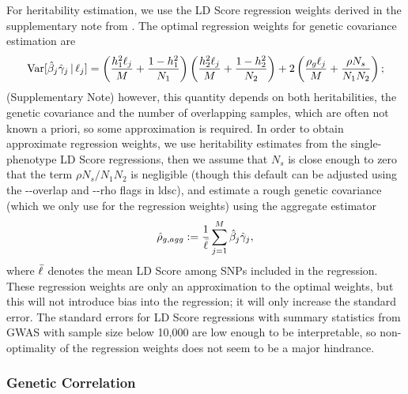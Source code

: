 \documentclass[11pt]{article}
\numberwithin{equation}{section}
\begin{document}
For heritability estimation, we use the LD Score regression weights derived in the 
supplementary note from \cite{buliksullivan2014}. 
The optimal regression weights for genetic covariance estimation are 
$$ \mathrm{Var}[\hat{\beta}_j\hat{\gamma}_j \,|\, \ell_j ] = 
	\left( 
		\frac{h_{1}^2\ell_j}{M} 
		+ 
		\frac{1-h_{1}^2}{N_1} 
	\right) \left(  
		\frac{h_{2}^2\ell_j}{M} 
		+ 
		\frac{1-h_{2}^2}{N_2}
	\right) 
	+ 					
	2\left( 
		\frac{\rho_g\ell_j}{M} 
		+ 
		\frac{\rho N_s}{N_1N_2} 
	\right);
$$
(Supplementary Note) however, this quantity depends on both heritabilities, 
the genetic covariance and the number of overlapping samples,
which are often not known a priori, so some approximation is required.
In order to obtain approximate regression weights, 
we use heritability estimates from the single-phenotype LD Score regressions, then
we assume that $N_s$ is close enough to zero that the term $\rho N_s/N_1N_2$ is negligible
(though this default can be adjusted using the {-}{-}overlap and {-}{-}rho flags in ldsc),
and estimate a rough genetic covariance (which we only use for the regression weights)
using the aggregate estimator 
$$\hat{\rho}_{g, agg} := \frac{1}{\bar{\ell}}\sum_{j=1}^M \hat{\beta}_j\hat{\gamma}_j,$$
where $\bar{\ell}$ denotes the mean LD Score among SNPs included in the regression.
These regression weights are only an approximation to the optimal weights,
but this will not introduce bias into the regression;
it will only increase the standard error. 
The standard errors for LD Score regressions with summary statistics 
from GWAS with sample size below 10,000 are low enough to be interpretable,
so non-optimality of the regression weights does not seem to be a major hindrance.

\subsubsection{Genetic Correlation}
\end{document}
